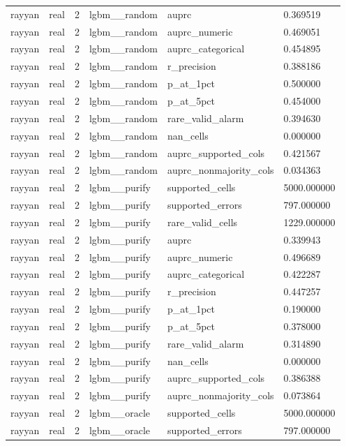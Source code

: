 \begin{tabular}{llllll}
rayyan & real & 2 & lgbm\_\_random & auprc & 0.369519 \\
rayyan & real & 2 & lgbm\_\_random & auprc\_numeric & 0.469051 \\
rayyan & real & 2 & lgbm\_\_random & auprc\_categorical & 0.454895 \\
rayyan & real & 2 & lgbm\_\_random & r\_precision & 0.388186 \\
rayyan & real & 2 & lgbm\_\_random & p\_at\_1pct & 0.500000 \\
rayyan & real & 2 & lgbm\_\_random & p\_at\_5pct & 0.454000 \\
rayyan & real & 2 & lgbm\_\_random & rare\_valid\_alarm & 0.394630 \\
rayyan & real & 2 & lgbm\_\_random & nan\_cells & 0.000000 \\
rayyan & real & 2 & lgbm\_\_random & auprc\_supported\_cols & 0.421567 \\
rayyan & real & 2 & lgbm\_\_random & auprc\_nonmajority\_cols & 0.034363 \\
rayyan & real & 2 & lgbm\_\_purify & supported\_cells & 5000.000000 \\
rayyan & real & 2 & lgbm\_\_purify & supported\_errors & 797.000000 \\
rayyan & real & 2 & lgbm\_\_purify & rare\_valid\_cells & 1229.000000 \\
rayyan & real & 2 & lgbm\_\_purify & auprc & 0.339943 \\
rayyan & real & 2 & lgbm\_\_purify & auprc\_numeric & 0.496689 \\
rayyan & real & 2 & lgbm\_\_purify & auprc\_categorical & 0.422287 \\
rayyan & real & 2 & lgbm\_\_purify & r\_precision & 0.447257 \\
rayyan & real & 2 & lgbm\_\_purify & p\_at\_1pct & 0.190000 \\
rayyan & real & 2 & lgbm\_\_purify & p\_at\_5pct & 0.378000 \\
rayyan & real & 2 & lgbm\_\_purify & rare\_valid\_alarm & 0.314890 \\
rayyan & real & 2 & lgbm\_\_purify & nan\_cells & 0.000000 \\
rayyan & real & 2 & lgbm\_\_purify & auprc\_supported\_cols & 0.386388 \\
rayyan & real & 2 & lgbm\_\_purify & auprc\_nonmajority\_cols & 0.073864 \\
rayyan & real & 2 & lgbm\_\_oracle & supported\_cells & 5000.000000 \\
rayyan & real & 2 & lgbm\_\_oracle & supported\_errors & 797.000000 \\

\end{tabular}
